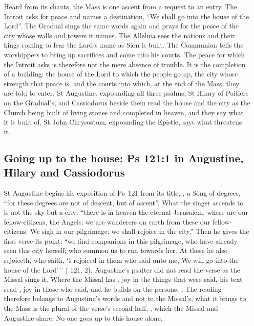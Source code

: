 \label{sec:peace-of-the-house}

Heard from its chants, the Mass is one ascent from a request to an entry. The
Introit asks for peace and names a destination, ``We shall go into the house of
the Lord''. The Gradual sings the same words again and prays for the peace of
the city whose walls and towers it names. The Alleluia sees the nations and
their kings coming to fear the Lord's name as Sion is built. The Communion
tells the worshippers to bring up sacrifices and come into his courts. The
peace for which the Introit asks is therefore not the mere absence of trouble.
It is the completion of a building: the house of the Lord to which the people
go up, the city whose strength that peace is, and the courts into which, at
the end of the Mass, they are told to enter. St Augustine, expounding all three
psalms, St Hilary of Poitiers on the Gradual's, and Cassiodorus beside them
read the house and the city as the Church being built of living stones and
completed in heaven, and they say what it is built of. St John Chrysostom,
expounding the Epistle, says what threatens it.

\subsection{Going up to the house: Ps 121:1 in Augustine, Hilary and Cassiodorus}

St Augustine begins his exposition of Ps~121 from its title, , a Song of degrees, ``for these degrees are not of descent, but of
ascent''. What the singer ascends to is not the sky but a city: ``there is in
heaven the eternal Jerusalem, where are our fellow-citizens, the Angels: we are
wanderers on earth from these our fellow-citizens. We sigh in our pilgrimage;
we shall rejoice in the city.'' Then he gives the first verse its point: ``we
find companions in this pilgrimage, who have already seen this city herself;
who summon us to run towards her. At these he also rejoiceth, who saith, `I
rejoiced in them who said unto me, We will go into the house of the Lord'\,''
( 121, 2). Augustine's psalter did not read the
verse as the Missal sings it. Where the Missal has , joy in the things that were said, his text read
, joy in those who said, and he
builds on the persons: . The
reading therefore belongs to Augustine's words and not to the Missal's; what it
brings to the Mass is the plural of the verse's second half, ,
which the Missal and Augustine share. No one goes up to this house alone.

